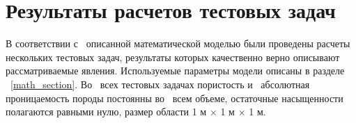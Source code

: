 %
\section{Результаты расчетов тестовых задач}
%
В соответствии с~ описанной математической моделью были проведены расчеты
нескольких тестовых задач, результаты которых качественно верно описывают
рассматриваемые явления.
Используемые параметры модели описаны
в разделе ~\ref{math_section}. Во~ всех тестовых задачах
пористость и~ абсолютная проницаемость породы постоянны во~ всем объеме,
остаточные насыщенности полагаются равными нулю, размер области 1 м $\times$ 1 м $\times$ 1 м.